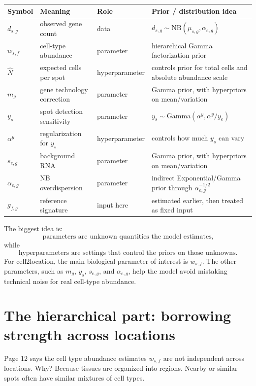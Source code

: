 \documentclass[11pt]{article}
\newcommand{\NB}{\mathrm{NB}}
\begin{document}
\begin{center}
\small
\begin{tabularx}{0.98\textwidth}{>{\bfseries}p{}p{}p{}X}
\toprule
Symbol & Meaning & Role & Prior / distribution idea \\
\midrule
$d_{s,g}$ & observed gene count & data & $d_{s,g}\sim \NB(\mu_{s,g},\alpha_{e,g})$ \\
$w_{s,f}$ & cell-type abundance & parameter & hierarchical Gamma factorization prior \\
$\hat N$ & expected cells per spot & hyperparameter & controls prior for total cells and absolute abundance scale \\
$m_g$ & gene technology correction & parameter & Gamma prior, with hyperpriors on mean/variation \\
$y_s$ & spot detection sensitivity & parameter & $y_s\sim \mathrm{Gamma}(\alpha^y,\alpha^y/y_e)$ \\
$\alpha^y$ & regularization for $y_s$ & hyperparameter & controls how much $y_s$ can vary \\
$s_{e,g}$ & background RNA & parameter & Gamma prior, with hyperpriors on mean/variation \\
$\alpha_{e,g}$ & NB overdispersion & parameter & indirect Exponential/Gamma prior through $\alpha_{e,g}^{-1/2}$ \\
$g_{f,g}$ & reference signature & input here & estimated earlier, then treated as fixed input \\
\bottomrule
\end{tabularx}
\end{center}

\begin{bigidea}
The biggest idea is:
\[
\text{parameters are unknown quantities the model estimates,}
\]
while
\[
\text{hyperparameters are settings that control the priors on those unknowns.}
\]
For cell2location, the main biological parameter of interest is $w_{s,f}$. The other parameters, such as $m_g$, $y_s$, $s_{e,g}$, and $\alpha_{e,g}$, help the model avoid mistaking technical noise for real cell-type abundance.
\end{bigidea}


\section{The hierarchical part: borrowing strength across locations}

Page 12 says the cell type abundance estimates $w_{s,f}$ are not independent across locations. Why? Because tissues are organized into regions. Nearby or similar spots often have similar mixtures of cell types.
\end{document}
